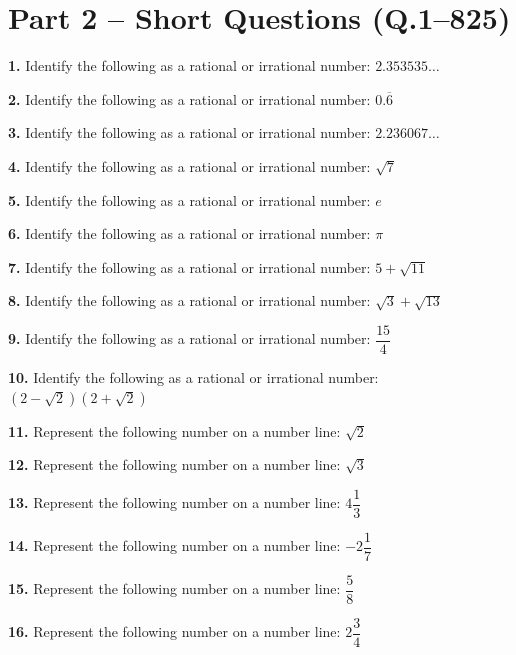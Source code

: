 \documentclass[11pt]{article}
\begin{document}
\clearpage

\section*{Part 2 -- Short Questions (Q.1--825)}

\bigskip
\noindent\textbf{1.} Identify the following as a rational or irrational number: $2.353535\ldots$

\bigskip
\noindent\textbf{2.} Identify the following as a rational or irrational number: $0.\overline{6}$

\bigskip
\noindent\textbf{3.} Identify the following as a rational or irrational number: $2.236067\ldots$

\bigskip
\noindent\textbf{4.} Identify the following as a rational or irrational number: $\sqrt{7}$

\bigskip
\noindent\textbf{5.} Identify the following as a rational or irrational number: $e$

\bigskip
\noindent\textbf{6.} Identify the following as a rational or irrational number: $\pi$

\bigskip
\noindent\textbf{7.} Identify the following as a rational or irrational number: $5+\sqrt{11}$

\bigskip
\noindent\textbf{8.} Identify the following as a rational or irrational number: $\sqrt{3}+\sqrt{13}$

\bigskip
\noindent\textbf{9.} Identify the following as a rational or irrational number: $\dfrac{15}{4}$

\bigskip
\noindent\textbf{10.} Identify the following as a rational or irrational number: $(2-\sqrt{2})(2+\sqrt{2})$

\bigskip
\noindent\textbf{11.} Represent the following number on a number line: $\sqrt{2}$

\bigskip
\noindent\textbf{12.} Represent the following number on a number line: $\sqrt{3}$

\bigskip
\noindent\textbf{13.} Represent the following number on a number line: $4\dfrac{1}{3}$

\bigskip
\noindent\textbf{14.} Represent the following number on a number line: $-2\dfrac{1}{7}$

\bigskip
\noindent\textbf{15.} Represent the following number on a number line: $\dfrac{5}{8}$

\bigskip
\noindent\textbf{16.} Represent the following number on a number line: $2\dfrac{3}{4}$
\end{document}
